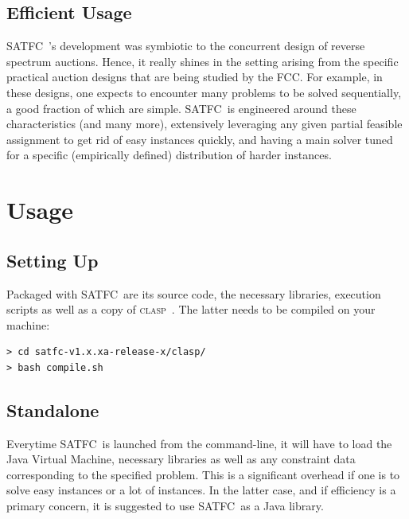 \documentclass[
10pt, %
a4paper, %
oneside, %
headinclude,footinclude, %
BCOR5mm, %
]{scrartcl}
\newcommand{\SATFC}{\textsc{SATFC}~}
\newcommand{\clasp}{\textsc{clasp}~}
\begin{document}
\subsection{Efficient Usage}
\SATFC's development was symbiotic to the concurrent design of reverse spectrum auctions. Hence, it really shines in the setting arising from the specific practical auction designs that are being studied by the FCC. For example, in these designs, one expects to encounter many problems to be solved sequentially, a good fraction of which are simple. \SATFC is engineered around these characteristics (and many more), extensively leveraging any given partial feasible assignment to get rid of easy instances quickly, and having a main solver tuned for a specific (empirically defined) distribution of harder instances.

\section{Usage}\label{sec:usage}

\subsection{Setting Up}

Packaged with \SATFC are its source code, the necessary libraries, execution scripts as well as a copy of \clasp. The latter needs to be compiled on your machine:

\begin{lstlisting}[style=Bash]
> cd satfc-v1.x.xa-release-x/clasp/
> bash compile.sh
\end{lstlisting}

\subsection{Standalone}\label{sec:standalone}

\begin{fwarning}
Everytime \SATFC is launched from the command-line, it will have to load the Java Virtual Machine, necessary libraries as well as any constraint data corresponding to the specified problem. This is a significant overhead if one is to solve easy instances or a lot of instances. In the latter case, and if efficiency is a primary concern, it is suggested to use \SATFC as a Java library.
\end{fwarning}
\end{document}
